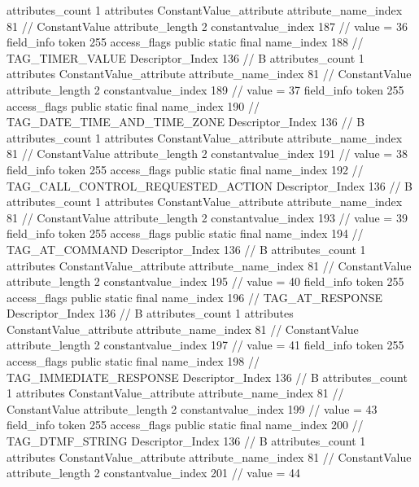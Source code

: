 {{{{{				attributes_count	1
				attributes {
				ConstantValue_attribute {
					attribute_name_index	81		// ConstantValue
					attribute_length	2
					constantvalue_index	187		// value = 36
				}
				}
			}
			field_info {
				token	255
				access_flags	public static final
				name_index	188		// TAG_TIMER_VALUE
				Descriptor_Index	136		// B
				attributes_count	1
				attributes {
				ConstantValue_attribute {
					attribute_name_index	81		// ConstantValue
					attribute_length	2
					constantvalue_index	189		// value = 37
				}
				}
			}
			field_info {
				token	255
				access_flags	public static final
				name_index	190		// TAG_DATE_TIME_AND_TIME_ZONE
				Descriptor_Index	136		// B
				attributes_count	1
				attributes {
				ConstantValue_attribute {
					attribute_name_index	81		// ConstantValue
					attribute_length	2
					constantvalue_index	191		// value = 38
				}
				}
			}
			field_info {
				token	255
				access_flags	public static final
				name_index	192		// TAG_CALL_CONTROL_REQUESTED_ACTION
				Descriptor_Index	136		// B
				attributes_count	1
				attributes {
				ConstantValue_attribute {
					attribute_name_index	81		// ConstantValue
					attribute_length	2
					constantvalue_index	193		// value = 39
				}
				}
			}
			field_info {
				token	255
				access_flags	public static final
				name_index	194		// TAG_AT_COMMAND
				Descriptor_Index	136		// B
				attributes_count	1
				attributes {
				ConstantValue_attribute {
					attribute_name_index	81		// ConstantValue
					attribute_length	2
					constantvalue_index	195		// value = 40
				}
				}
			}
			field_info {
				token	255
				access_flags	public static final
				name_index	196		// TAG_AT_RESPONSE
				Descriptor_Index	136		// B
				attributes_count	1
				attributes {
				ConstantValue_attribute {
					attribute_name_index	81		// ConstantValue
					attribute_length	2
					constantvalue_index	197		// value = 41
				}
				}
			}
			field_info {
				token	255
				access_flags	public static final
				name_index	198		// TAG_IMMEDIATE_RESPONSE
				Descriptor_Index	136		// B
				attributes_count	1
				attributes {
				ConstantValue_attribute {
					attribute_name_index	81		// ConstantValue
					attribute_length	2
					constantvalue_index	199		// value = 43
				}
				}
			}
			field_info {
				token	255
				access_flags	public static final
				name_index	200		// TAG_DTMF_STRING
				Descriptor_Index	136		// B
				attributes_count	1
				attributes {
				ConstantValue_attribute {
					attribute_name_index	81		// ConstantValue
					attribute_length	2
					constantvalue_index	201		// value = 44
				}
}}}}}}
